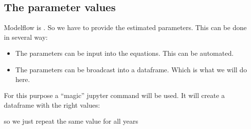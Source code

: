 \documentclass[letterpaper,10pt,english]{jupyterBook}
\begin{document}
\subsection{The parameter values}
\label{\detokenize{content/howto/smallmodel/modelstart:the-parameter-values}}
\sphinxAtStartPar
Modelflow is . So we have to provide the estimated parameters. 
This can be done in several way:
\begin{itemize}
\item {} 
\sphinxAtStartPar
The parameters can be input into the equations. This can be automated.

\item {} 
\sphinxAtStartPar
The parameters can be broadcast into a dataframe. Which is what we will do here.

\end{itemize}

\sphinxAtStartPar
For this purpose a “magic” jupyter command will be used. It will create a dataframe with the right values:

\sphinxAtStartPar
{} so we just repeat the same value for all years
\end{document}
